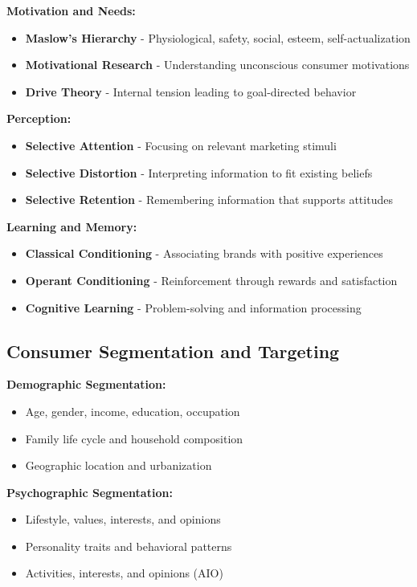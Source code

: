\documentclass[12pt]{article}
\begin{document}
\textbf{Motivation and Needs:}
\begin{itemize}
    \item \textbf{Maslow's Hierarchy} - Physiological, safety, social, esteem, self-actualization
    \item \textbf{Motivational Research} - Understanding unconscious consumer motivations
    \item \textbf{Drive Theory} - Internal tension leading to goal-directed behavior
\end{itemize}

\textbf{Perception:}
\begin{itemize}
    \item \textbf{Selective Attention} - Focusing on relevant marketing stimuli
    \item \textbf{Selective Distortion} - Interpreting information to fit existing beliefs
    \item \textbf{Selective Retention} - Remembering information that supports attitudes
\end{itemize}

\textbf{Learning and Memory:}
\begin{itemize}
    \item \textbf{Classical Conditioning} - Associating brands with positive experiences
    \item \textbf{Operant Conditioning} - Reinforcement through rewards and satisfaction
    \item \textbf{Cognitive Learning} - Problem-solving and information processing
\end{itemize}

\subsection{Consumer Segmentation and Targeting}

\textbf{Demographic Segmentation:}
\begin{itemize}
    \item Age, gender, income, education, occupation
    \item Family life cycle and household composition
    \item Geographic location and urbanization
\end{itemize}

\textbf{Psychographic Segmentation:}
\begin{itemize}
    \item Lifestyle, values, interests, and opinions
    \item Personality traits and behavioral patterns
    \item Activities, interests, and opinions (AIO)
\end{itemize}
\end{document}
